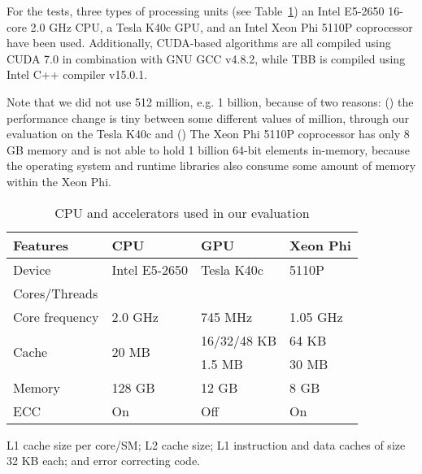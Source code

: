 \documentclass[article]{elsarticle}
\renewcommand{\hl}[1]{#1}
\begin{document}
{For the tests, three types of processing units (see Table~\ref{tab:processing_units})  an Intel E5-2650 16-core 2.0 GHz CPU, a Tesla K40c GPU, and an Intel Xeon Phi 5110P coprocessor  have been used. Additionally, CUDA-based algorithms are all compiled using CUDA 7.0 in combination with GNU GCC v4.8.2, while TBB is compiled using Intel C++ compiler v15.0.1.

\hl{Note that we did not use   512 million, e.g. 1 billion, because of two reasons: () the performance change is tiny between some different values of   million, through our evaluation on the Tesla K40c and () The Xeon Phi 5110P coprocessor has only 8 GB memory and is not able to hold 1 billion 64-bit elements in-memory, because the operating system and runtime libraries also consume some amount of memory within the Xeon Phi.}
\begin{table}[!h]
\caption{CPU and accelerators used in our evaluation}
\label{tab:processing_units}
\centering
\begin{threeparttable}
\begin{tabular}{|l||l||l||l|}
\hline
\textbf{Features} &\textbf{CPU}&	\textbf{GPU}&	\textbf{Xeon Phi}\\
\hline
Device& Intel E5-2650&	 Tesla K40c&	5110P\\ 
\hline
Cores/Threads&	&	&	\\
\hline
Core frequency&	2.0 GHz&	745 MHz	&		1.05 GHz\\
\hline
\multirow{2}{*}{Cache}&	\multirow{2}{*}{20 MB}&	16/32/48 KB&	64 KB\\
\hhline{~~--}
&	&	1.5 MB &		30 MB\\
\hline
Memory&	128 GB&	12 GB&	8 GB\\
\hline
ECC&	On&		Off&	On\\
\hline
\end{tabular}
\begin{tablenotes}
\item L1 cache size per core/SM; L2 cache size; L1 instruction and data caches of size 32 KB each; and error correcting code.
\end{tablenotes}
\end{threeparttable}
\end{table}

}
\end{document}
